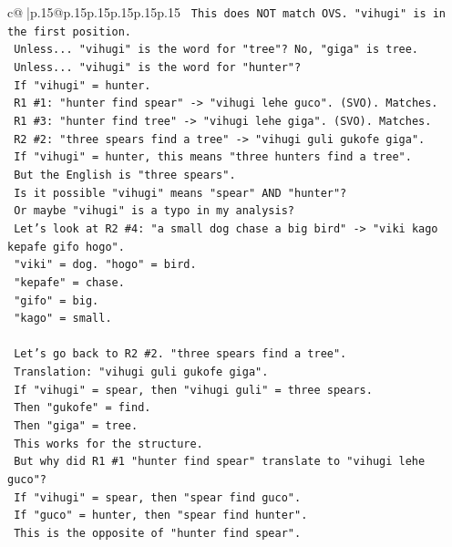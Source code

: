 \documentclass{article}
\begin{document}
{\begin{supertabular}{c@{$\;$}|p{.15\linewidth}@{}p{.15\linewidth}p{.15\linewidth}p{.15\linewidth}p{.15\linewidth}p{.15\linewidth}}
{{{\texttt{   This does NOT match OVS. "vihugi" is in the first position.} \\
\texttt{   Unless... "vihugi" is the word for "tree"? No, "giga" is tree.} \\
\texttt{   Unless... "vihugi" is the word for "hunter"?} \\
\texttt{   If "vihugi" = hunter.} \\
\texttt{   R1 \#1: "hunter find spear" {-}> "vihugi lehe guco". (SVO). Matches.} \\
\texttt{   R1 \#3: "hunter find tree" {-}> "vihugi lehe giga". (SVO). Matches.} \\
\texttt{   R2 \#2: "three spears find a tree" {-}> "vihugi guli gukofe giga".} \\
\texttt{   If "vihugi" = hunter, this means "three hunters find a tree".} \\
\texttt{   But the English is "three spears".} \\
\texttt{   Is it possible "vihugi" means "spear" AND "hunter"?} \\
\texttt{   Or maybe "vihugi" is a typo in my analysis?} \\
\texttt{   Let's look at R2 \#4: "a small dog chase a big bird" {-}> "viki kago kepafe gifo hogo".} \\
\texttt{   "viki" = dog. "hogo" = bird.} \\
\texttt{   "kepafe" = chase.} \\
\texttt{   "gifo" = big.} \\
\texttt{   "kago" = small.} \\
\\ 
\texttt{   Let's go back to R2 \#2. "three spears find a tree".} \\
\texttt{   Translation: "vihugi guli gukofe giga".} \\
\texttt{   If "vihugi" = spear, then "vihugi guli" = three spears.} \\
\texttt{   Then "gukofe" = find.} \\
\texttt{   Then "giga" = tree.} \\
\texttt{   This works for the structure.} \\
\texttt{   But why did R1 \#1 "hunter find spear" translate to "vihugi lehe guco"?} \\
\texttt{   If "vihugi" = spear, then "spear find guco".} \\
\texttt{   If "guco" = hunter, then "spear find hunter".} \\
\texttt{   This is the opposite of "hunter find spear".} \\
}}}
\end{supertabular}}
\end{document}
